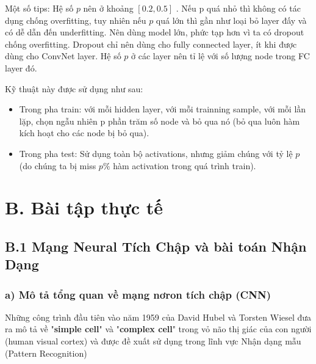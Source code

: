 \documentclass{article}
\begin{document}
	Một số tips: Hệ số $p$ nên ở khoảng $[0.2, 0.5]$ . Nếu p quá nhỏ thì không có tác dụng chống overfitting, tuy nhiên nếu $p$ quá lớn thì gần như loại bỏ layer đấy và có dễ dẫn đến underfitting. Nên dùng model lớn, phức tạp hơn vì ta có dropout chống overfitting. Dropout chỉ nên dùng cho fully connected layer, ít khi được dùng cho ConvNet layer. Hệ số $p$ ở các layer nên tỉ lệ với số lượng node trong FC layer đó.
	
	Kỹ thuật này được sử dụng như sau:
	\begin{itemize}
		\item Trong pha train: với mỗi hidden layer, với mỗi trainning sample, với mỗi lần lặp, chọn ngẫu nhiên p phần trăm số node và bỏ qua nó (bỏ qua luôn hàm kích hoạt cho các node bị bỏ qua).
		\item Trong pha test: Sử dụng toàn bộ activations, nhưng giảm chúng với tỷ lệ $p$ (do chúng ta bị miss $p\%$ hàm activation trong quá trình train).
	\end{itemize}
	
	\section{B. Bài tập thực tế}
	
	
	\subsection{B.1 Mạng Neural Tích Chập và bài toán Nhận Dạng}
	
	\subsubsection{a) Mô tả tổng quan về mạng nơron tích chập (CNN)}
	\qquad Những công trình đầu tiên vào năm 1959 của David Hubel và Torsten Wiesel đưa ra mô tả về "\textbf{simple cell}" và "\textbf{complex cell}" trong vỏ não thị giác của con người (human visual cortex) và được đề xuất sử dụng trong lĩnh vực Nhận dạng mẫu (Pattern Recognition)
	
\end{document}
